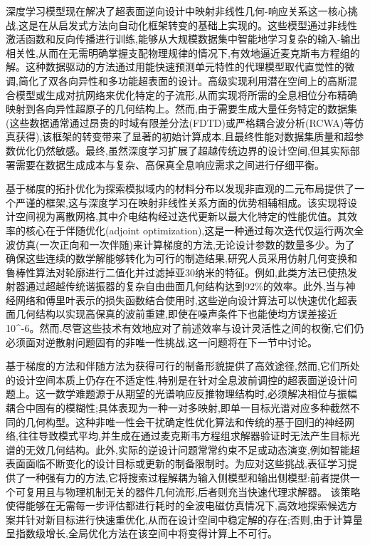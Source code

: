 \documentclass[11pt]{article}
\begin{document}
深度学习模型现在解决了超表面逆向设计中映射非线性几何-响应关系这一核心挑战,这是在从启发式方法向自动化框架转变的基础上实现的。这些模型通过非线性激活函数和反向传播进行训练,能够从大规模数据集中智能地学习复杂的输入-输出相关性,从而在无需明确掌握支配物理规律的情况下,有效地逼近麦克斯韦方程组的解。这种数据驱动的方法通过用能快速预测单元特性的代理模型取代直觉性的微调,简化了双各向异性和多功能超表面的设计。高级实现利用潜在空间上的高斯混合模型或生成对抗网络来优化特定的子流形,从而实现将所需的全息相位分布精确映射到各向异性超原子的几何结构上。然而,由于需要生成大量任务特定的数据集(这些数据通常通过昂贵的时域有限差分法(FDTD)或严格耦合波分析(RCWA)等仿真获得),该框架的转变带来了显著的初始计算成本,且最终性能对数据集质量和超参数优化仍然敏感。最终,虽然深度学习扩展了超越传统边界的设计空间,但其实际部署需要在数据生成成本与复杂、高保真全息响应需求之间进行仔细平衡。\citep{doi_10_1515_nanoph_2019_0474_d2187501} \citep{doi_10_48550_arxiv_2204_00433_1c5cfd3e} \citep{doi_10_3390_photonics12100947_b44bdefd}

基于梯度的拓扑优化为探索模拟域内的材料分布以发现非直观的二元布局提供了一个严谨的框架,这与深度学习在映射非线性关系方面的优势相辅相成。该实现将设计空间视为离散网格,其中介电结构经过迭代更新以最大化特定的性能优值。其效率的核心在于伴随优化(adjoint optimization),这是一种通过每次迭代仅运行两次全波仿真(一次正向和一次伴随)来计算梯度的方法,无论设计参数的数量多少。为了确保这些连续的数学解能够转化为可行的制造结果,研究人员采用仿射几何变换和鲁棒性算法对轮廓进行二值化并过滤掉亚30纳米的特征。例如,此类方法已使热发射器通过超越传统谐振器的复杂自由曲面几何结构达到92\%的效率。此外,当与神经网络和傅里叶表示的损失函数结合使用时,这些逆向设计算法可以快速优化超表面几何结构以实现高保真的波前重建,即使在噪声条件下也能使均方误差接近10\^{}-6。然而,尽管这些技术有效地应对了前述效率与设计灵活性之间的权衡,它们仍必须面对逆散射问题固有的非唯一性挑战,这一问题将在下一节中讨论。\citep{doi_10_1002_adom_202500249_9967e710} \citep{doi_10_48550_arxiv_2603_15210_fdcfb92f} \citep{doi_10_1515_nanoph_2020_0579_8812c5b1}

基于梯度的方法和伴随方法为获得可行的制备形貌提供了高效途径,然而,它们所处的设计空间本质上仍存在不适定性,特别是在针对全息波前调控的超表面逆设计问题上。这一数学难题源于从期望的光谱响应反推物理结构时,必须解决相位与振幅耦合中固有的模糊性;具体表现为一种一对多映射,即单一目标光谱对应多种截然不同的几何构型。这种非唯一性会干扰确定性优化算法和传统的基于回归的神经网络,往往导致模式平均,并生成在通过麦克斯韦方程组求解器验证时无法产生目标光谱的无效几何结构。此外,实际的逆设计问题常常约束不足或动态演变,例如智能超表面面临不断变化的设计目标或更新的制备限制时。为应对这些挑战,表征学习提供了一种强有力的方法,它将搜索过程解耦为输入侧模型和输出侧模型:前者提供一个可复用且与物理机制无关的器件几何流形,后者则充当快速代理求解器。\citep{doi_10_2139_ssrn_4082312_28ca582d} 该策略使得能够在无需每一步评估都进行耗时的全波电磁仿真情况下,高效地探索候选方案并针对新目标进行快速重优化,从而在设计空间中稳定解的存在;否则,由于计算量呈指数级增长,全局优化方法在该空间中将变得计算上不可行。\citep{doi_10_71465_fapm546_bda368a5} \citep{doi_10_1002_adom_202502062_d73a85e1}
\end{document}
